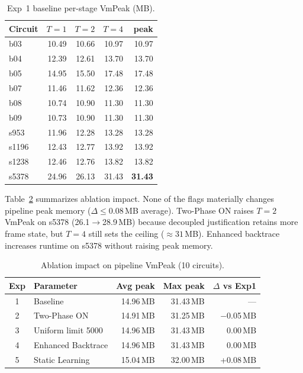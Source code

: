 \documentclass[conference]{IEEEtran}
\begin{document}
\begin{table}[t]
\caption{Exp~1 baseline per-stage VmPeak (MB).}
\label{tab:mem-exp1}
\centering
\footnotesize
\begin{tabular}{@{}lrrrr@{}}
\toprule
Circuit & $T{=}1$ & $T{=}2$ & $T{=}4$ & peak \\
\midrule
b03   & 10.49 & 10.66 & 10.97 & 10.97 \\
b04   & 12.39 & 12.61 & 13.70 & 13.70 \\
b05   & 14.95 & 15.50 & 17.48 & 17.48 \\
b07   & 11.46 & 11.62 & 12.36 & 12.36 \\
b08   & 10.74 & 10.90 & 11.30 & 11.30 \\
b09   & 10.73 & 10.90 & 11.30 & 11.30 \\
s953  & 11.96 & 12.28 & 13.28 & 13.28 \\
s1196 & 12.43 & 12.77 & 13.92 & 13.92 \\
s1238 & 12.46 & 12.76 & 13.82 & 13.82 \\
s5378 & 24.96 & 26.13 & 31.43 & \textbf{31.43} \\
\bottomrule
\end{tabular}
\end{table}

Table~\ref{tab:mem-ablation} summarizes ablation impact. None of the flags
materially changes pipeline peak memory ($\Delta{\leq}0.08$\,MB average). Two-Phase
ON raises $T{=}2$ VmPeak on s5378 (26.1$\to$28.9\,MB) because decoupled
justification retains more frame state, but $T{=}4$ still sets the ceiling
(${\approx}31$\,MB). Enhanced backtrace increases runtime on s5378 without
raising peak memory.

\begin{table}[t]
\caption{Ablation impact on pipeline VmPeak (10 circuits).}
\label{tab:mem-ablation}
\centering
\footnotesize
\begin{tabular}{@{}clrrr@{}}
\toprule
Exp & Parameter & Avg peak & Max peak & $\Delta$ vs Exp1 \\
\midrule
1 & Baseline & 14.96\,MB & 31.43\,MB & --- \\
2 & Two-Phase ON & 14.91\,MB & 31.25\,MB & $-$0.05\,MB \\
3 & Uniform limit 5000 & 14.96\,MB & 31.43\,MB & 0.00\,MB \\
4 & Enhanced Backtrace & 14.96\,MB & 31.43\,MB & 0.00\,MB \\
5 & Static Learning & 15.04\,MB & 32.00\,MB & +0.08\,MB \\
\bottomrule
\end{tabular}
\end{table}
\end{document}
